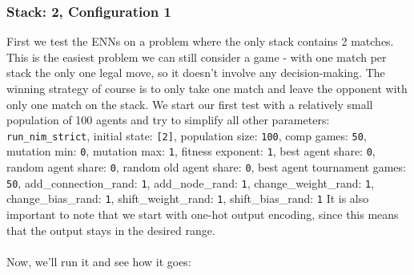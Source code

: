 \documentclass[11pt]{report}
\begin{document}
\begin{enumerate}
                \subsubsection{Stack: 2, Configuration 1}
    First we test the ENNs on a problem where the only stack contains 2 matches.
    This is the easiest problem we can still consider a game - with one match per stack the only one legal move, so it doesn't involve any decision-making.
    The winning strategy of course is to only take one match and leave the opponent with only one match on the stack.
    We start our first test with a relatively small population of 100 agents and try to simplify all other parameters:
    \\
    \texttt{run\_nim\_strict}, initial state: \texttt{[2]}, population size: \texttt{100}, comp games: \texttt{50}, mutation min: \texttt{0}, mutation max: \texttt{1}, fitness exponent: \texttt{1}, best agent share:
    \texttt{0}, random agent share: \texttt{0}, random old agent share: \texttt{0}, best agent tournament games: \texttt{50}, add\_connection\_rand: \texttt{1}, add\_node\_rand: \texttt{1}, change\_weight\_rand: \texttt{1}, change\_bias\_rand: \texttt{1}, shift\_weight\_rand: \texttt{1}, shift\_bias\_rand: \texttt{1}
    It is also important to note that we start with one-hot output encoding, since this means that the output stays in the desired range.
    \\ \\
    Now, we'll run it and see how it goes:
    \\
    \newcommand{\csvpath}{../data/simple_nim/stack_2/t_1/stats.csv} %
    \begin{center}
\end{center}
\end{enumerate}
\end{document}
